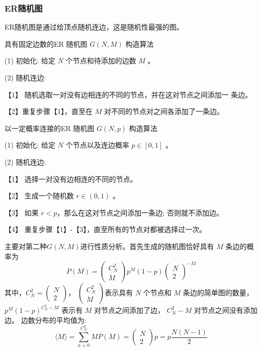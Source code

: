\subsubsection*{ER随机图}
ER随机图是通过给顶点随机连边，这是随机性最强的图。\par
\noindent 具有固定边数的ER 随机图 $G(N,M)$ 构造算法\par
\noindent(1) 初始化: 给定 $N$ 个节点和待添加的边数 $M$ 。\par
\noindent(2) 随机连边:\par
【1】 随机选取一对没有边相连的不同的节点，并在这对节点之间添加一 条边。\par
【2】重复步骤【1】，直至在 $M$ 对不同的节点对之间各添加了一条边。\par
\noindent 以一定概率连接的ER 随机图 $G(N,p)$ 构造算法\par
\noindent(1) 初始化: 给定 $N$ 个节点以及连边概率 $p \in[0,1]$ 。\par
\noindent(2) 随机连边:\par
【1】 选择一对没有边相连的不同的节点。\par
【2】 生成一个随机数 $r \in(0,1)$ 。\par
【3】 如果 $r<p$，那么在这对节点之间添加一条边; 否则就不添加边。\par
【4】 重复步骤【1】-【3】，直至所有的节点对都被选择过一次。\par
主要对第二种$G(N,M)$进行性质分析。首先生成的随机图恰好具有 $M$ 条边的概率为
\begin{equation}
    P(M)=\left(\begin{array}{c}
    C^2_N \\
    M
    \end{array}\right) p^M(1-p)\left(\begin{array}{c}
    N \\
    2
    \end{array}\right)^{-M}
\end{equation}
其中，$C^2_N=\left(\begin{array}{c}
    N \\
    2
    \end{array}\right)$，
$\left(\begin{array}{c}
    C^2_N \\
    M
    \end{array}\right)$表示具有 $N$ 个节点和 $M$ 条边的简单图的数量，
    $p^M(1-p)^{C^2_N-M}$ 
表示有 $M$ 对节点之间添加了边， $C^2_N-M$ 对节点之间没有添加边。
边数分布的平均值为:
\begin{equation}
    \langle M\rangle=\sum_{n=0}^{C^2_N} M P(M)=\left(\begin{array}{l}
    N \\
    2
    \end{array}\right) p=p \frac{N(N-1)}{2}
    \end{equation}
